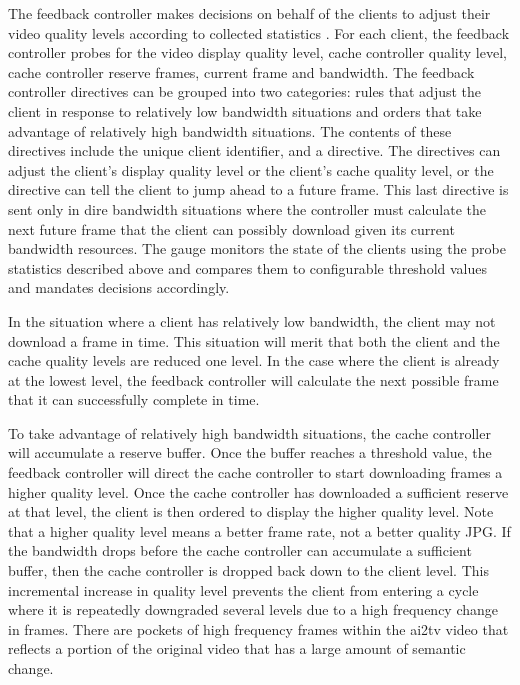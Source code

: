 \documentclass{sig-alternate}
\begin{document}
The feedback controller makes decisions on behalf of the clients to
adjust their video quality levels according to collected statistics .
For each client, the feedback controller probes for the video display
quality level, cache controller quality level, cache controller
reserve frames, current frame and bandwidth.  The feedback controller
directives can be grouped into two categories: rules that adjust the
client in response to relatively low bandwidth situations and orders
that take advantage of relatively high bandwidth situations.  The
contents of these directives include the unique client identifier, and
a directive.  The directives can adjust the client's display quality
level or the client's cache quality level, or the directive can tell
the client to jump ahead to a future frame.  This last directive is
sent only in dire bandwidth situations where the controller must
calculate the next future frame that the client can possibly download
given its current bandwidth resources.  The gauge monitors the state
of the clients using the probe statistics described above and compares
them to configurable threshold values and mandates decisions
accordingly.

In the situation where a client has relatively low bandwidth, the
client may not download a frame in time.  This situation will merit
that both the client and the cache quality levels are reduced one
level.  In the case where the client is already at the lowest level,
the feedback controller will calculate the next possible frame that it
can successfully complete in time.

To take advantage of relatively high bandwidth situations, the cache
controller will accumulate a reserve buffer.  Once the buffer reaches
a threshold value, the feedback controller will direct the cache
controller to start downloading frames a higher quality level.  Once
the cache controller has downloaded a sufficient reserve at that
level, the client is then ordered to display the higher quality level.
Note that a higher quality level means a better frame rate, not a
better quality JPG.  If the bandwidth drops before the cache
controller can accumulate a sufficient buffer, then the cache
controller is dropped back down to the client level.  This incremental
increase in quality level prevents the client from entering a cycle
where it is repeatedly downgraded several levels due to a high
frequency change in frames.  There are pockets of high frequency
frames within the ai2tv video that reflects a portion of the original
video that has a large amount of semantic change.
\end{document}
